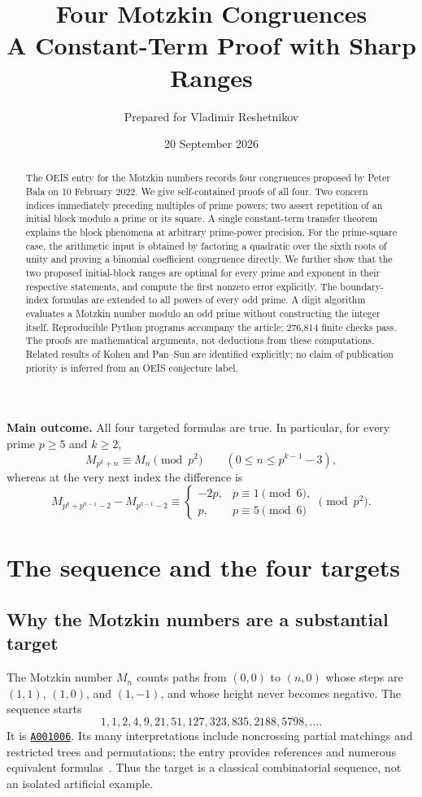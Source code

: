 \documentclass[11pt,a4paper]{article}
\title{\textbf{Four Motzkin Congruences}\\[0.3em]
\large A Constant-Term Proof with Sharp Ranges}
\author{Prepared for Vladimir Reshetnikov}
\date{20 September 2026}
\numberwithin{equation}{section}
\theoremstyle{definition}
\theoremstyle{remark}
\newcommand{\oeis}[1]{\href{https://oeis.org/#1}{\texttt{#1}}}
\begin{document}
\maketitle
\begin{abstract}
The OEIS entry for the Motzkin numbers records four congruences proposed by
Peter Bala on 10 February 2022. We give self-contained proofs of all four.
Two concern indices immediately preceding multiples of prime powers; two
assert repetition of an initial block modulo a prime or its square.
A single constant-term transfer theorem explains the block phenomena at
arbitrary prime-power precision. For the prime-square case, the arithmetic
input is obtained by factoring a quadratic over the sixth roots of unity
and proving a binomial coefficient congruence directly. We further show
that the two proposed initial-block ranges are optimal for every prime and
exponent in their respective statements, and compute the first nonzero
error explicitly. The boundary-index formulas are extended to all powers
of every odd prime. A digit algorithm evaluates a Motzkin number modulo an
odd prime without constructing the integer itself. Reproducible Python
programs accompany the article; 276,814 finite checks pass. The proofs are
mathematical arguments, not deductions from these computations. Related
results of Kohen and Pan--Sun are identified explicitly; no claim of
publication priority is inferred from an OEIS conjecture label.
\end{abstract}

\vspace{0.4em}
\noindent\textbf{Main outcome.} All four targeted formulas are true. In particular,
for every prime $p\geq5$ and $k\geq2$,
\[
 M_{p^k+n}\equiv M_n\pmod{p^2}
 \qquad(0\leq n\leq p^{k-1}-3),
\]
whereas at the very next index the difference is
\[
 M_{p^k+p^{k-1}-2}-M_{p^{k-1}-2}
 \equiv
 \begin{cases}-2p,&p\equiv1\pmod6,\\p,&p\equiv5\pmod6\end{cases}
 \pmod{p^2}.
\]
\newpage
{\small\setlength{\parskip}{0pt}
\tableofcontents
}
\newpage

\section{The sequence and the four targets}\label{sec:targets}

\subsection{Why the Motzkin numbers are a substantial target}
The Motzkin number $M_n$ counts paths from $(0,0)$ to $(n,0)$ whose steps
are $(1,1)$, $(1,0)$, and $(1,-1)$, and whose height never becomes negative.
The sequence starts
\[
 1,1,2,4,9,21,51,127,323,835,2188,5798,\ldots.
\]
It is \oeis{A001006}. Its many interpretations include noncrossing partial
matchings and restricted trees and permutations; the entry provides
references and numerous equivalent formulas~\cite{oeisM}. Thus the target
is a classical combinatorial sequence, not an isolated artificial example.
\end{document}
